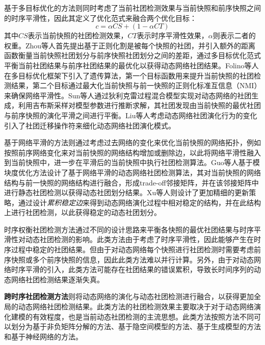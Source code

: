 基于多目标优化的方法则同时考虑了当前社团检测效果与当前快照和前序快照之间的时序平滑性，因此其定义了优化范式来融合两个优化目标：
\begin{equation}
c=\alpha CS+(1-\alpha CT)    
\end{equation}
其中$CS$表示当前快照的社团检测效果，$CT$表示时序平滑性效果，$\alpha$则表示二者的权重。Zhou等人\cite{zhou2007discovering}首先提出基于正则化割是被每个快照的社团，并引入额外的距离函数衡量当前快照社团划分与前序快照社团划分之间的差距，通过多目标优化范式平衡当前社团结果与前序社团结果的最优化以获得动态网络社团结果。Folino等人\cite{folino2013evolutionary}在多目标优化框架下引入了遗传算法，第一个目标函数用来提升当前快照的社团检测结果，第二个目标通过最大化当前快照与前一快照的正则化标准互信息（NMI）来确保网络平滑性。Sun等人\cite{sun2013co}通过狄利克雷过程混合模型实现对动态网络的社团生成，利用吉布斯采样对模型参数进行推断求解，其社团发现由当前快照的最优社团与前序快照的演化平滑之间进行平衡。Liu等人\cite{liu2020detecting}考虑动态网络社团演化行为的变化引入了社团迁移操作符来细化动态网络社团演化模式。

基于网络平滑的方法则通过考虑过去网络的变化来优化当前快照的网络拓扑，例如按照前序网络变化来对当前快照的网络结构增加或删除边，以此将网络平滑性融入到当前快照中，进一步在平滑后的当前快照中执行社团检测算法。Guo等人\cite{guo2014evolutionary}基于模块度优化方法设计了基于网络平滑的动态网络社团检测算法，其对当前快照的网络结构与前一快照的网络结构进行融合，形成trade-off邻接矩阵，并在该邻接矩阵中进行静态社团检测以获得动态社团划分结果。Xu等人\cite{xu2013community}则设计了更加精细的更新策略，通过设计\textit{累积稳定边}来得到动态网络演化过程中相对稳定的结构，并在此结构上进行社团检测，以此获得稳定的动态社团划分。

时序权衡社团检测方法通过不同的设计思路来平衡各快照的最优社团结果与时序平滑性对动态社团检测的影响。此类方法由于考虑了时序平滑性，因此能够产生在时序过程中稳定的社团结果。但由于对动态网络每个快照进行社团检测时需要考虑前序快照或多个前序快照的信息，因此此类方法难以并行计算。另外，由于对动态网络时序平滑的引入，此类方法可能存在社团结果的错误累积，导致长时间序列的动态网络社团检测结果逐渐失真。


\textbf{跨时序社团检测方法}则将动态网络的演化与动态社团检测进行融合，以获得更加全局的动态网络社团检测结果。此类方法的社团检测效果主要取决于对于动态网络演化建模的有效程度，也是当前动态社团检测的主流思想。此类方法按照方法不同可以划分为基于非负矩阵分解的方法、基于隐空间模型的方法、基于生成模型的方法和基于神经网络的方法。

